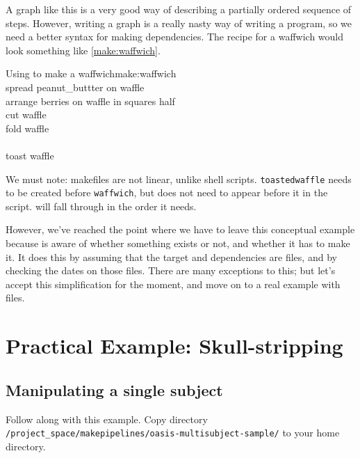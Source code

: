 A graph like this is a very good way of describing a partially ordered sequence of steps.  However, writing a graph is a really nasty way of writing a program, so we need a better syntax for making dependencies. The \maken{} recipe for a waffwich would look something like \autoref{make:waffwich}.

\begin{make}{Using \maken{} to make a waffwich}{make:waffwich}
	 \\
	\tab	spread peanut_buttter \dd on waffle \\
	\tab arrange berries \dd on waffle \dd in squares \dd half \\
	\tab cut waffle \\ 
	\tab fold waffle \\
	
	 \\
	\tab toast waffle
\end{make}

We must note: makefiles are not linear, unlike shell scripts. \texttt{toastedwaffle} needs to be created before \texttt{waffwich}, but does not need to appear before it in the script. \maken{} will fall through in the order it needs.

However, we've reached the point where we have to leave this conceptual example because \maken{} is aware of whether something exists or not, and whether it has to make it. It does this by assuming that the target and dependencies are files, and by checking the dates on those files. There are many exceptions to this; but let's accept this simplification for the moment, and move on to a real example with files.

\section{Practical Example: Skull-stripping}

\subsection{Manipulating a single subject}

Follow along with this example. Copy directory 
\newline\texttt{/project_space/makepipelines/oasis-multisubject-sample/} \newline
to your home directory. 

